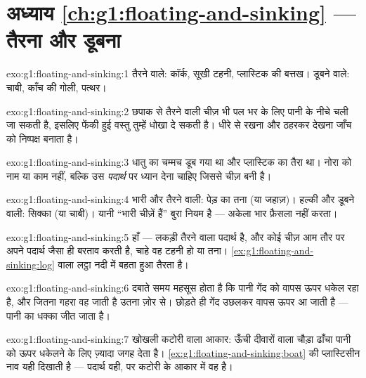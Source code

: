 \section*{अध्याय \ref{ch:g1:floating-and-sinking} --- तैरना और डूबना}

\begin{solution}{exo:g1:floating-and-sinking:1}
तैरने वाले: कॉर्क, सूखी टहनी, प्लास्टिक की बत्तख। डूबने वाले: चाबी,
काँच की गोली, पत्थर।
\end{solution}

\begin{solution}{exo:g1:floating-and-sinking:2}
छपाक से तैरने वाली चीज़ भी पल भर के लिए पानी के नीचे चली जा सकती है,
इसलिए फेंकी हुई वस्तु तुम्हें धोखा दे सकती है। धीरे से रखना और ठहरकर
देखना जाँच को निष्पक्ष बनाता है।
\end{solution}

\begin{solution}{exo:g1:floating-and-sinking:3}
धातु का चम्मच डूब गया था और प्लास्टिक का तैरा था। नोरा को नाम या काम
नहीं, बल्कि उस \emph{पदार्थ} पर ध्यान देना चाहिए जिससे चीज़ बनी है।
\end{solution}

\begin{solution}{exo:g1:floating-and-sinking:4}
भारी और तैरने वाली: पेड़ का तना (या जहाज़)। हल्की और डूबने वाली:
सिक्का (या चाबी)। यानी ``भारी चीज़ें  हैं'' बुरा नियम है ---
अकेला भार फ़ैसला नहीं करता।
\end{solution}

\begin{solution}{exo:g1:floating-and-sinking:5}
हाँ --- लकड़ी तैरने वाला पदार्थ है, और कोई चीज़ आम तौर पर अपने पदार्थ
जैसा ही बरताव करती है, चाहे वह टहनी हो या तना।
\cref{ex:g1:floating-and-sinking:log} वाला लट्ठा नदी में बहता हुआ
तैरता है।
\end{solution}

\begin{solution}{exo:g1:floating-and-sinking:6}
दबाते समय महसूस होता है कि पानी गेंद को वापस ऊपर धकेल रहा है, और
जितना गहरा वह जाती है उतना ज़ोर से। छोड़ते ही गेंद उछलकर वापस ऊपर आ
जाती है --- पानी का धक्का जीत जाता है।
\end{solution}

\begin{solution}{exo:g1:floating-and-sinking:7}
खोखली कटोरी वाला आकार: ऊँची दीवारों वाला चौड़ा ढाँचा पानी को ऊपर
धकेलने के लिए ज़्यादा जगह देता है।
\cref{ex:g1:floating-and-sinking:boat} की प्लास्टिसीन नाव यही दिखाती
है --- पदार्थ वही, पर कटोरी के आकार में वह  है।
\end{solution}

